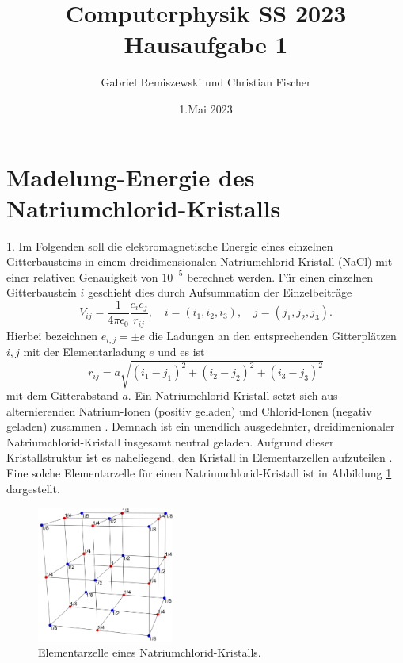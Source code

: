 \documentclass[11pt,a4paper]{article}
\title{\textbf{Computerphysik SS 2023 \\ Hausaufgabe 1}}
\author{Gabriel Remiszewski und Christian Fischer}
\date{1.Mai 2023}
\begin{document}
\maketitle

\section*{Madelung-Energie des Natriumchlorid-Kristalls}\label{sec:energie}

1. Im Folgenden soll die elektromagnetische Energie eines einzelnen Gitterbausteins in einem dreidimensionalen Natriumchlorid-Kristall
(NaCl) mit einer relativen Genauigkeit von $10^{-5}$ berechnet werden. Für einen einzelnen Gitterbaustein $i$ geschieht dies durch
Aufsummation der Einzelbeiträge
\begin{equation*}
    V_{ij} = \frac{1}{4\pi\epsilon_0}\frac{e_i e_j}{r_{ij}}, \quad i = (i_1,i_2,i_3), \quad j = (j_1,j_2,j_3).
\end{equation*}
Hierbei bezeichnen $e_{i,j} = \pm e$ die Ladungen an den entsprechenden Gitterplätzen $i,j$ mit der Elementarladung $e$
und es ist
\begin{equation*}
    r_{ij} = a \sqrt{(i_1 - j_1)   ^2 + (i_2 - j_2)    ^2 + (i_3 - j_3)    ^2}
\end{equation*}
mit dem Gitterabstand $a$. Ein Natriumchlorid-Kristall setzt sich aus alternierenden Natrium-Ionen (positiv geladen) und
Chlorid-Ionen (negativ geladen) zusammen \cite{key1}. Demnach ist ein unendlich ausgedehnter, dreidimenionaler Natriumchlorid-Kristall
insgesamt neutral geladen. Aufgrund dieser Kristallstruktur ist es naheliegend, den Kristall in Elementarzellen aufzuteilen \cite{key2}. Eine solche Elementarzelle
für einen Natriumchlorid-Kristall ist in Abbildung \ref{fig:nacl} dargestellt.
\begin{figure}[htbp]
    \centering
    \includegraphics[width=0.4\textwidth,scale=0.4]{Cube}
    \caption[Elementarzelle eines Natriumchlorid-Kristalls.]{Elementarzelle eines Natriumchlorid-Kristalls.}\label{fig:nacl}
\end{figure}
\end{document}
